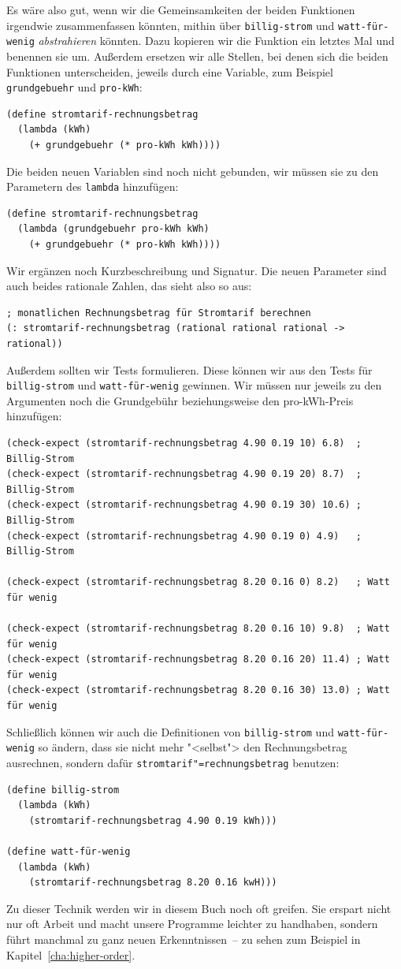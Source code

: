 Es wäre also gut, wenn wir die Gemeinsamkeiten der beiden Funktionen
irgendwie zusammenfassen könnten, mithin über \texttt{billig-strom}
und \texttt{watt-für-wenig} \textit{abstrahieren}
könnten.  Dazu kopieren wir die Funktion ein letztes Mal und benennen
sie um.  Außerdem ersetzen wir alle Stellen, bei denen sich die beiden
Funktionen unterscheiden, jeweils durch eine Variable, zum Beispiel
\texttt{grundgebuehr} und \texttt{pro-kWh}:
%
\begin{verbatim}
(define stromtarif-rechnungsbetrag
  (lambda (kWh)
    (+ grundgebuehr (* pro-kWh kWh))))
\end{verbatim}
%
Die beiden neuen Variablen sind noch nicht gebunden, wir müssen sie zu
den Parametern des \texttt{lambda} hinzufügen:
%
\begin{verbatim}
(define stromtarif-rechnungsbetrag
  (lambda (grundgebuehr pro-kWh kWh)
    (+ grundgebuehr (* pro-kWh kWh))))
\end{verbatim}
%
Wir ergänzen noch Kurzbeschreibung und Signatur.  Die neuen Parameter
sind auch beides rationale Zahlen, das sieht also so aus:
%
\begin{verbatim}
; monatlichen Rechnungsbetrag für Stromtarif berechnen
(: stromtarif-rechnungsbetrag (rational rational rational -> rational))
\end{verbatim}
%
Außerdem sollten wir Tests formulieren.  Diese können wir aus den
Tests für \texttt{billig-strom} und \texttt{watt-für-wenig} gewinnen.
Wir müssen nur jeweils zu den Argumenten noch die Grundgebühr
beziehungsweise den pro-kWh-Preis hinzufügen:
%
\begin{verbatim}
(check-expect (stromtarif-rechnungsbetrag 4.90 0.19 10) 6.8)  ; Billig-Strom
(check-expect (stromtarif-rechnungsbetrag 4.90 0.19 20) 8.7)  ; Billig-Strom
(check-expect (stromtarif-rechnungsbetrag 4.90 0.19 30) 10.6) ; Billig-Strom
(check-expect (stromtarif-rechnungsbetrag 4.90 0.19 0) 4.9)   ; Billig-Strom

(check-expect (stromtarif-rechnungsbetrag 8.20 0.16 0) 8.2)   ; Watt für wenig

(check-expect (stromtarif-rechnungsbetrag 8.20 0.16 10) 9.8)  ; Watt für wenig
(check-expect (stromtarif-rechnungsbetrag 8.20 0.16 20) 11.4) ; Watt für wenig
(check-expect (stromtarif-rechnungsbetrag 8.20 0.16 30) 13.0) ; Watt für wenig
\end{verbatim}
%
Schließlich können wir auch die Definitionen von \texttt{billig-strom}
und \texttt{watt-für-wenig} so ändern, dass sie nicht mehr "<selbst">
den Rechnungsbetrag ausrechnen, sondern dafür
\texttt{stromtarif"=rechnungsbetrag} benutzen:
%
\begin{verbatim}
(define billig-strom
  (lambda (kWh)
    (stromtarif-rechnungsbetrag 4.90 0.19 kWh)))

(define watt-für-wenig
  (lambda (kWh)
    (stromtarif-rechnungsbetrag 8.20 0.16 kwH)))
\end{verbatim}
%
Zu dieser Technik werden wir in diesem Buch noch oft greifen.  Sie
erspart nicht nur oft Arbeit und macht unsere Programme leichter zu
handhaben, sondern führt manchmal zu ganz neuen Erkenntnissen~--
zu sehen zum Beispiel in Kapitel~\ref{cha:higher-order}.

